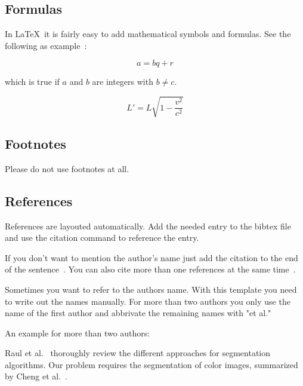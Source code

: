 \subsection{Formulas}

In \LaTeX~it is fairly easy to add mathematical symbols and formulas. See the following as example~\cite{wiki_2019_mat}:

\begin{equation} \label{eq:erl}
    a = bq + r
\end{equation}

which is true if $a$ and $b$ are integers with $b \neq c$.

\begin{equation}
    L' = {L}{\sqrt{1-\frac{v^2}{c^2}}}
\end{equation}


\subsection{Footnotes}

Please do not use footnotes at all.


\subsection{References}

References are layouted automatically. Add the needed entry to the bibtex file and use the citation command to reference the entry.

If you don't want to mention the author's name just add the citation to the end of the sentence~\cite{perlin_1985_ais}. You can also cite more than one references at the same time~\cite{gebhardt_2018_ofa, perlin_1985_ais, semmo_2015_iso}.

Sometimes you want to refer to the authors name. With this template you need to write out the names manually. For more than two authors you only use the name of the first author and abbrivate the remaining names with "et al."

An example for more than two authors:

Raul et al.~\cite{raut_2009_isa} thoroughly review the different approaches for segmentation algorithms. Our problem requires the segmentation of color images, summarized by Cheng et al.~\cite{cheng_2001_cis}.

